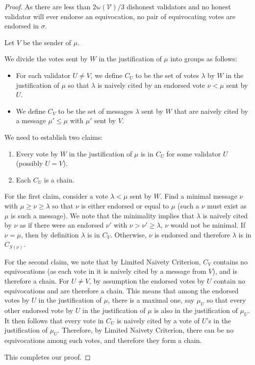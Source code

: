 \documentclass[12pt, fleqn]{article}
\newcommand{\ww}{\mathbb{w}}
\begin{document}
\begin{proof}
As there are less than $2\ww(\mathcal{V})/3$ dishonest validators and no honest validator will ever endorse an equivocation, no pair of equivocating votes are endorsed in $\sigma$. 

Let $V$ be the sender of $\mu$.

We divide the votes sent by $W$ in the justification of $\mu$ into groups as follows:
\begin{itemize}
\item For each validator $U \neq V$, we define $C_U$ to be the set of votes $\lambda$ by $W$ in the justification of $\mu$ so that
$\lambda$ is naively cited by an endorsed vote $\nu < \mu$ sent by $U$.
\item We define $C_V$ to be the set of messages $\lambda$ sent by $W$ that are naively cited by a message $\mu' \leq \mu$ with $\mu'$ sent by $V$.
\end{itemize}

We need to establish two claims:
\begin{enumerate}
\item Every vote by $W$ in the justification of $\mu$ is in $C_U$ for some validator $U$ (possibly $U=V$).
\item Each $C_U$ is a chain.
\end{enumerate}

For the first claim, consider a vote $\lambda < \mu$ sent by $W$. Find a minimal message $\nu$ with $\mu \geq \nu \geq \lambda$ so that $\nu$ is either endorsed or equal to $\mu$ (such a $\nu$ must exist as $\mu$ is such a message). We note that the minimality implies that $\lambda$ is naively cited by $\nu$ as if there were an endorsed $\nu'$ with $\nu > \nu' \geq \lambda$, $\nu$ would not be minimal. If $\nu=\mu$, then by definition $\lambda$ is in $C_V$. Otherwise, $\nu$ is endorsed and therefore $\lambda$ is in $C_{S(\nu)}$.

For the second claim, we note that by Limited Naivety Criterion, $C_V$ contains no equivocations (as each vote in it is naively cited by a message from $V$), and is therefore a chain. For $U \neq V$, by assumption the endorsed votes by $U$ contain no equivocations and are therefore a chain. This means that among the endorsed votes by $U$ in the justification of $\mu$, there is a maximal one, say $\mu_U$ so that every other endorsed vote by $U$ in the justification of $\mu$ is also in the justification of $\mu_U$. It then follows that every vote in $C_U$ is naively cited by a vote of $U$'s in the justification of $\mu_U$. Therefore, by Limited Naivety Criterion, there can be no equivocations among such votes, and therefore they form a chain.

This completes our proof.
\end{proof}
\end{document}
